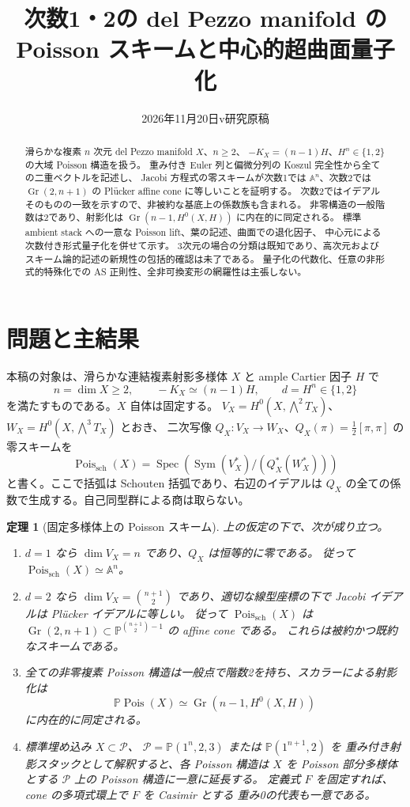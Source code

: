 \documentclass[a4paper,11pt]{ltjsarticle}
\title{次数1・2の del Pezzo manifold の\texorpdfstring{\\}{ }Poisson スキームと中心的超曲面量子化}
\author{}
\date{2026年11月20日\quad v\Version\quad 研究原稿}
\numberwithin{equation}{section}
\theoremstyle{plain}
\newtheorem{theorem}{定理}[section]
\theoremstyle{definition}
\newcommand{\Gr}{\operatorname{Gr}}
\newcommand{\Pois}{\operatorname{Pois}}
\begin{document}
\maketitle
\begin{abstract}
滑らかな複素 $n$ 次元 del Pezzo manifold $X$、$n\geq2$、
$-K_X=(n-1)H$、$H^n\in\{1,2\}$ の大域 Poisson 構造を扱う。
重み付き Euler 列と偏微分列の Koszul 完全性から全ての二重ベクトルを記述し、
Jacobi 方程式の零スキームが次数1では $\mathbb A^n$、次数2では
$\operatorname{Gr}(2,n+1)$ の Pl\"ucker affine cone に等しいことを証明する。
次数2ではイデアルそのものの一致を示すので、非被約な基底上の係数族も含まれる。
非零構造の一般階数は2であり、射影化は
$\operatorname{Gr}(n-1,H^0(X,H))$ に内在的に同定される。
標準 ambient stack への一意な Poisson lift、葉の記述、曲面での退化因子、
中心元による次数付き形式量子化を併せて示す。
3次元の場合の分類は既知であり、高次元およびスキーム論的記述の新規性の包括的確認は未了である。
量子化の代数化、任意の非形式的特殊化での AS 正則性、全非可換変形の網羅性は主張しない。
\end{abstract}
\tableofcontents

\section{問題と主結果}
\label{sec:introduction}
本稿の対象は、滑らかな連結複素射影多様体 $X$ と ample Cartier 因子 $H$ で
\[
 n=\dim X\geq2,\qquad -K_X\simeq(n-1)H,\qquad d=H^n\in\{1,2\}
\]
を満たすものである。$X$ 自体は固定する。
$V_X=H^0(X,\bigwedge^2T_X)$、$W_X=H^0(X,\bigwedge^3T_X)$ とおき、
二次写像 $Q_X:V_X\to W_X$、$Q_X(\pi)=\frac12[\pi,\pi]$ の零スキームを
\[
 \Pois_{\mathrm{sch}}(X)=
 \operatorname{Spec}\!\left(\operatorname{Sym}(V_X^*)/
       (Q_X^*(W_X^*))\right)
\]
と書く。ここで括弧は Schouten 括弧であり、右辺のイデアルは
$Q_X$ の全ての係数で生成する。自己同型群による商は取らない。

\begin{theorem}[固定多様体上の Poisson スキーム]
\label{thm:main}
上の仮定の下で、次が成り立つ。
\begin{enumerate}
\item $d=1$ なら $\dim V_X=n$ であり、$Q_X$ は恒等的に零である。
従って $\Pois_{\mathrm{sch}}(X)\simeq\mathbb A^n$。
\item $d=2$ なら $\dim V_X=\binom{n+1}{2}$ であり、適切な線型座標の下で
Jacobi イデアルは Pl\"ucker イデアルに等しい。
従って $\Pois_{\mathrm{sch}}(X)$ は
$\Gr(2,n+1)\subset\mathbb P^{\binom{n+1}{2}-1}$ の affine cone である。
これらは被約かつ既約なスキームである。
\item 全ての非零複素 Poisson 構造は一般点で階数2を持ち、スカラーによる射影化は
\[
 \mathbb P\Pois(X)\simeq\Gr(n-1,H^0(X,H))
\]
に内在的に同定される。
\item 標準埋め込み $X\subset\mathcal P$、
$\mathcal P=\mathbb P(1^n,2,3)$ または $\mathbb P(1^{n+1},2)$ を
重み付き射影スタックとして解釈すると、各 Poisson 構造は
$X$ を Poisson 部分多様体とする $\mathcal P$ 上の Poisson 構造に一意に延長する。
定義式 $F$ を固定すれば、cone の多項式環上で $F$ を Casimir とする
重み0の代表も一意である。
\end{enumerate}
\end{theorem}
\end{document}
